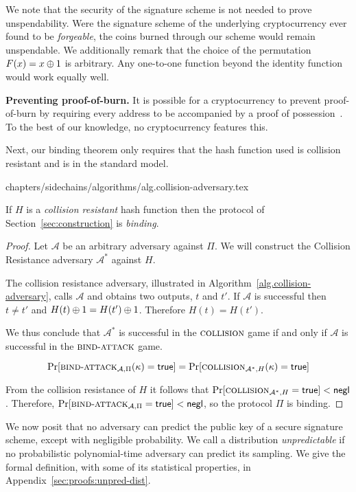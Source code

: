 We note that the security of the signature scheme is not needed to prove unspendability. Were the signature scheme of the underlying cryptocurrency ever found to be \emph{forgeable}, the coins burned through our scheme would remain unspendable. We additionally remark that the
choice of the permutation $F(x) = x \oplus 1$ is arbitrary. Any one-to-one
function beyond the identity function would work equally well.

\noindent
\textbf{Preventing proof-of-burn.}
It is possible for a cryptocurrency to prevent proof-of-burn by requiring every address to be accompanied by a proof of possession~\cite{EPRINT:RisYil07}. To the best of our knowledge, no cryptocurrency features this.

Next, our binding theorem only requires that the hash function used is collision
resistant and is in the standard model.

{chapters/sidechains/algorithms/alg.collision-adversary.tex}

\begin{theorem}[Binding]
  If $H$ is a \emph{collision resistant} hash function then the protocol of Section~\ref{sec:construction} is \emph{binding}.
\end{theorem}
\begin{proof}
  Let $\mathcal{A}$ be an arbitrary adversary against $\Pi$.
  We will construct the Collision Resistance adversary $\mathcal{A}^*$ against $H$.

  The collision resistance adversary, illustrated in Algorithm~\ref{alg.collision-adversary}, calls $\mathcal{A}$ and obtains two outputs, $t$ and $t'$. If $\mathcal{A}$ is successful then $t \neq t'$ and $H(t) \oplus 1 = H(t') \oplus 1$. Therefore $H(t) = H(t')$.

  We thus conclude that $\mathcal{A^*}$ is successful in the $\textsc{collision}$ game if and only if $\mathcal{A}$ is successful in the $\textsc{bind}\-\text{-}\-\textsc{attack}$ game.

  \[
    \Pr[\textsc{bind}\-\text{-}\-\textsc{attack}_{\mathcal{A},\Pi}(\kappa) = \textsf{true}]
    =
    \Pr[\textsc{collision}_{\mathcal{A}^*,H}(\kappa) = \textsf{true}]
  \]

  From the collision resistance of $H$ it follows that $\Pr[\textsc{collision}_{\mathcal{A}^*,H} = \textsf{true}] < \mathsf{negl}$. Therefore,
  $\Pr[\textsc{bind}\-\text{-}\-\textsc{attack}_{\mathcal{A},\Pi} = \textsf{true}] < \mathsf{negl}$, so
  the protocol $\Pi$ is binding.
\end{proof}

We now posit that no adversary can predict the public key of a secure signature scheme, except with negligible probability. We call a distribution \emph{unpredictable} if no
probabilistic polynomial-time adversary can predict its sampling. We give
the formal definition, with some of its statistical properties, in
Appendix~\ref{sec:proofs:unpred-dist}.

